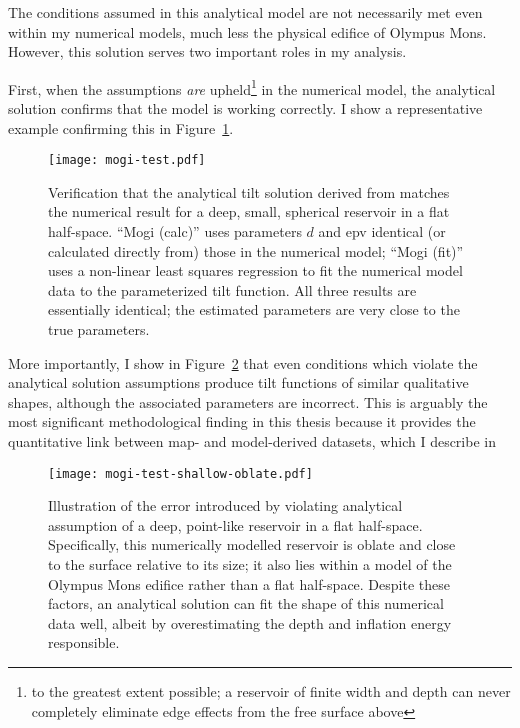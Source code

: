 The conditions assumed in this analytical model are not necessarily met even within my numerical models, much less the physical edifice of Olympus Mons. However, this solution serves two important roles in my analysis. 

First, when the assumptions \emph{are} upheld\footnote{to the greatest extent possible; a reservoir of finite width and depth can never completely eliminate edge effects from the free surface above} in the numerical model, the analytical solution confirms that the model is working correctly. I show a representative example confirming this in Figure~\ref{fig:mogi-test}.

\begin{figure}
    \texttt{[image: mogi-test.pdf]}%
    \caption[Analytical solution verification]{Verification that the analytical tilt solution derived from \textcite{mogi_relations_1958} matches the numerical result for a deep, small, spherical reservoir in a flat half-space. ``Mogi (calc)'' uses parameters $d$ and \acs{epv} identical (or calculated directly from) those in the numerical model; ``Mogi (fit)'' uses a non-linear least squares regression to fit the numerical model data to the parameterized tilt function. All three results are essentially identical; the estimated parameters are very close to the true parameters.}%
    \label{fig:mogi-test}
\end{figure}

More importantly, I show in Figure~\ref{fig:mogi-test-shallow-oblate} that even conditions which violate the analytical solution assumptions produce tilt functions of similar qualitative shapes, although the associated parameters are incorrect. This is arguably the most significant methodological finding in this thesis because it provides the quantitative link between map- and model-derived datasets, which I describe in 

\begin{figure}
    \texttt{[image: mogi-test-shallow-oblate.pdf]}%
    \caption[Analytical model sensitivity to reservoir geometry]{Illustration of the error introduced by violating analytical assumption of a deep, point-like reservoir in a flat half-space. Specifically, this numerically modelled reservoir is oblate and close to the surface relative to its size; it also lies within a model of the Olympus Mons edifice rather than a flat half-space. Despite these factors, an analytical solution can fit the shape of this numerical data well, albeit by overestimating the depth and inflation energy responsible.}%
    \label{fig:mogi-test-shallow-oblate}
\end{figure}


